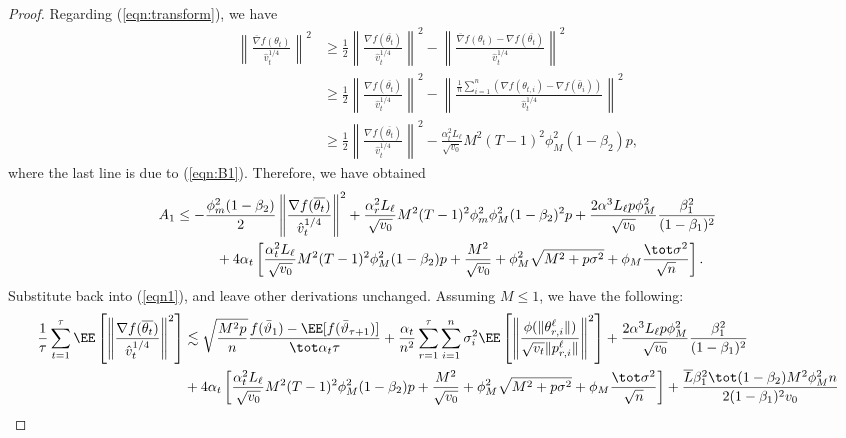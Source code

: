 \documentclass[11pt]{article}
\begin{document}
\begin{proof}
Regarding (\ref{eqn:transform}), we have
\begin{align*}
\left\| \frac{\overline{\nabla}f(\theta_t)}{\hat v_t^{1/4}} \right\|^2 & \geq \frac{1}{2} \left\| \frac{\nabla f(\overline{\theta_t})}{\hat v_t^{1/4}} \right\|^2 - \left\| \frac{\overline{\nabla}f(\theta_t)- \nabla f(\overline{\theta_t})}{\hat v_t^{1/4}} \right\|^2\\
& \geq \frac{1}{2} \left\| \frac{\nabla f(\overline{\theta_t})}{\hat v_t^{1/4}} \right\|^2 - \left\| \frac{\frac{1}{n}\sum_{i=1}^n (\nabla f(\theta_{t,i})-\nabla f(\bar\theta_i))}{\hat v_t^{1/4}} \right\|^2 \\
&\geq \frac{1}{2} \left\| \frac{\nabla f(\overline{\theta_t})}{\hat v_t^{1/4}} \right\|^2 - \frac{\alpha_t^2 L_\ell}{\sqrt{v_0}} M^2 (T-1)^2 \phi_M^2 (1-\beta_2)p,
\end{align*}
where the last line is due to (\ref{eqn:B1}). Therefore, we have obtained
\begin{align*}
    A_1&\leq -\frac{\phi_m^2(1-\beta_2)}{2}\left\| \frac{\nabla f(\overline{\theta_t})}{\hat v_t^{1/4}} \right\|^2+\frac{\alpha_r^2 L_\ell}{\sqrt{v_0}} M^2 (T-1)^2 \phi_m^2\phi_M^2 (1-\beta_2)^2p+\frac{2\alpha^3 L_\ell p\phi_M^2}{ \sqrt{v_0}}\frac{\beta_1^2}{(1-\beta_1)^2} \\
    &\hspace{0.4in}  + 4\alpha_t \left[ \frac{\alpha_t^2 L_\ell}{\sqrt{v_0}}  M^2 (T-1)^2 \phi_M^2 (1-\beta_2)p + \frac{M^2}{\sqrt{v_0}}+\phi_M^2\sqrt{M^2+p\sigma^2} + \phi_M \frac{\tot \sigma^2}{\sqrt{n}}\right].
\end{align*}
Substitute back into (\ref{eqn1}), and leave other derivations unchanged. Assuming $M\leq 1$, we have the following:
\begin{align*}
    \frac{1}{\tau}\sum_{t=1}^\tau  \EE\left[ \left\| \frac{\nabla f(\overline{\theta_t})}{\hat v_t^{1/4}}   \right \|^2 \right] & \lesssim  \sqrt{\frac{M^2 p}{n}} \frac{ f(\bar{\vartheta}_1)  - \EE[ f(\bar{\vartheta}_{\tau+1})]}{\tot \alpha_t \tau}+   \frac{\alpha_t}{n^2}  \sum_{r=1}^\tau  \sum_{i = 1}^n  \sigma_i^2 \EE\left[ \left\|\frac{\phi(\|\theta_{r,i}^{\ell}\|)}{\sqrt{v_t} \|p_{r,i}^{\ell}\|} \right\|^2 \right] +\frac{2\alpha^3 L_\ell p\phi_M^2}{ \sqrt{v_0}}\frac{\beta_1^2}{(1-\beta_1)^2} \nonumber\\
   &   +4\alpha_t \left[ \frac{\alpha_t^2 L_\ell}{\sqrt{v_0}}  M^2 (T-1)^2 \phi_M^2 (1-\beta_2)p + \frac{M^2}{\sqrt{v_0}}+\phi_M^2\sqrt{M^2+p\sigma^2} + \phi_M \frac{\tot \sigma^2}{\sqrt{n}}\right] + \frac{ \overline{L}\beta_1^2\tot(1-\beta_2)M^2 \phi^2_M n}{2(1-\beta_1)^2 v_0}   \nonumber \\

\end{align*}
\end{proof}
\end{document}

